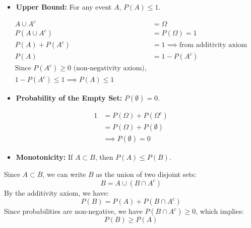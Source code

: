 \begin{itemize}
\begin{itemize}
    \item \textbf{Upper Bound:} For any event \(A\), \(P(A) \leq 1\).
\end{itemize}
\begin{proofboxbreak}{}
    \begin{align}
        A \cup A^{c} &= \Omega \\
        P(A \cup A^{c}) &= P(\Omega) = 1 \\ 
        P(A) + P(A^{c}) &= 1 \implies \text{from additivity axiom} \\
        P(A) &= 1 - P(A^{c}) \\
        \text{Since } P(A^{c}) \geq 0 \text{ (non-negativity axiom),} \\
        1 - P(A^{c}) \leq 1 \implies P(A) \leq 1
    \end{align} 
\end{proofboxbreak}
\begin{itemize}
    \item \textbf{Probability of the Empty Set:} \(P(\emptyset) = 0\).
\end{itemize}
\begin{proofboxbreak}{}
    \begin{align}
        1 &= P(\Omega)  + P(\Omega^{c}) \\
        &= P(\Omega) + P(\emptyset) \\
        &\implies P(\emptyset) = 0 
    \end{align}   
\end{proofboxbreak}

\begin{itemize}
    \item \textbf{Monotonicity:} If \(A \subset B\), then \(P(A) \leq P(B)\).
\end{itemize}
\begin{proofboxbreak}{}
    Since \(A \subset B\), we can write \(B\) as the union of two disjoint sets:
    \[ B = A \cup (B \cap A^{c}) \]
    By the additivity axiom, we have:
    \[ P(B) = P(A) + P(B \cap A^{c}) \]
    Since probabilities are non-negative, we have \(P(B \cap A^{c}) \geq 0\), which implies:
    \[ P(B) \geq P(A) \]
\end{proofboxbreak}


\end{itemize}

